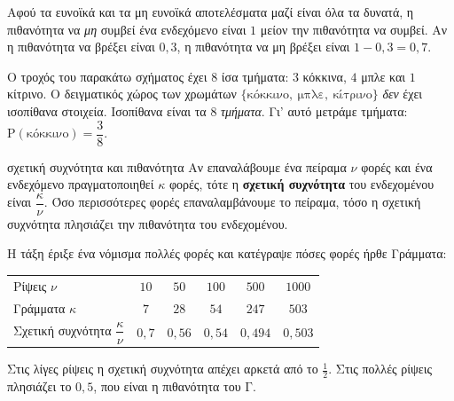 Αφού τα ευνοϊκά και τα μη ευνοϊκά αποτελέσματα μαζί είναι όλα τα δυνατά, η πιθανότητα να \emph{μη} συμβεί ένα ενδεχόμενο είναι $1$ μείον την πιθανότητα να συμβεί. Αν η πιθανότητα να βρέξει είναι $0{,}3$, η πιθανότητα να μη βρέξει είναι $1-0{,}3=0{,}7$.

Ο τροχός του παρακάτω σχήματος έχει $8$ ίσα τμήματα: $3$ κόκκινα, $4$ μπλε και $1$ κίτρινο. Ο δειγματικός χώρος των χρωμάτων $\{\text{κόκκινο},\ \text{μπλε},\ \text{κίτρινο}\}$ \emph{δεν} έχει ισοπίθανα στοιχεία. Ισοπίθανα είναι τα $8$ \emph{τμήματα}. Γι' αυτό μετράμε τμήματα: $\mathrm{Ρ}(\text{κόκκινο})=\dfrac{3}{8}$.

\begin{center}
\end{center}

\begin{kanonas}{σχετική συχνότητα και πιθανότητα}
Αν επαναλάβουμε ένα πείραμα $\nu$ φορές και ένα ενδεχόμενο πραγματοποιηθεί $\kappa$ φορές, τότε η \textbf{σχετική συχνότητα} του ενδεχομένου είναι $\dfrac{\kappa}{\nu}$. Όσο περισσότερες φορές επαναλαμβάνουμε το πείραμα, τόσο η σχετική συχνότητα πλησιάζει την πιθανότητα του ενδεχομένου.
\end{kanonas}

Η τάξη έριξε ένα νόμισμα πολλές φορές και κατέγραψε πόσες φορές ήρθε Γράμματα:

\begin{center}
\renewcommand{\arraystretch}{1.25}
\begin{tabular}{lccccc}
\toprule
Ρίψεις $\nu$ & $10$ & $50$ & $100$ & $500$ & $1000$\\
Γράμματα $\kappa$ & $7$ & $28$ & $54$ & $247$ & $503$\\
Σχετική συχνότητα $\dfrac{\kappa}{\nu}$ & $0{,}7$ & $0{,}56$ & $0{,}54$ & $0{,}494$ & $0{,}503$\\
\bottomrule
\end{tabular}
\end{center}

Στις λίγες ρίψεις η σχετική συχνότητα απέχει αρκετά από το $\frac{1}{2}$. Στις πολλές ρίψεις πλησιάζει το $0{,}5$, που είναι η πιθανότητα του $\mathrm{Γ}$.

